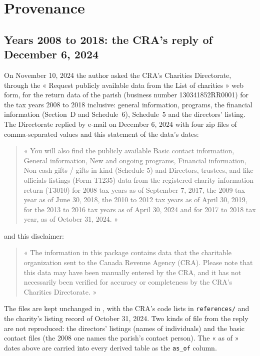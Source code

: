 \documentclass[11pt,letterpaper]{article}
\begin{document}
\section{Provenance}\label{sec:prov}

\subsection{Years 2008 to 2018: the CRA's reply of December 6, 2024}

On November 10, 2024 the author asked the CRA's Charities Directorate, through the « Request publicly available data from the List of charities » web form, for the return data of the parish (business number 130341852RR0001) for the tax years 2008 to 2018 inclusive: general information, programs, the financial information (Section~D and Schedule~6), Schedule~5 and the directors' listing. The Directorate replied by e-mail on December 6, 2024 with four zip files of comma-separated values and this statement of the data's dates:

\begin{quote}\small
« You will also find the publicly available Basic contact information, General information, New and ongoing programs, Financial information, Non-cash gifts / gifts in kind (Schedule 5) and Directors, trustees, and like officials listings (Form T1235) data from the registered charity information return (T3010) for 2008 tax years as of September 7, 2017, the 2009 tax year as of June 30, 2018, the 2010 to 2012 tax years as of April 30, 2019, for the 2013 to 2016 tax years as of April 30, 2024 and for 2017 to 2018 tax year, as of October 31, 2024. »
\end{quote}

and this disclaimer:

\begin{quote}\small
« The information in this package contains data that the charitable organization sent to the Canada Revenue Agency (CRA). Please note that this data may have been manually entered by the CRA, and it has not necessarily been verified for accuracy or completeness by the CRA's Charities Directorate. »
\end{quote}

The files are kept unchanged in , with the CRA's code lists in \texttt{references/} and the charity's listing record of October 31, 2024. Two kinds of file from the reply are not reproduced: the directors' listings (names of individuals) and the basic contact files (the 2008 one names the parish's contact person). The « as of » dates above are carried into every derived table as the \texttt{as\_of} column.
\end{document}
